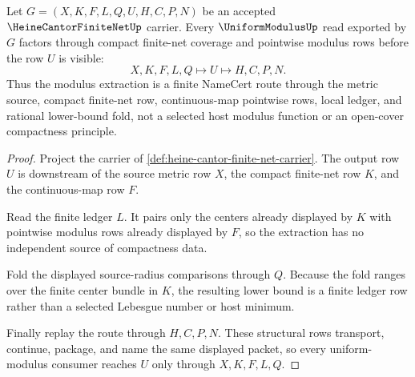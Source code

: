 \begin{theorem}
\label{thm:heine-cantor-finite-net-modulus-extraction}
Let $G=(X,K,F,L,Q,U,H,C,P,N)$ be an accepted $\HeineCantorFiniteNetUp$ carrier. Every $\UniformModulusUp$ read exported by $G$ factors through compact finite-net coverage and pointwise modulus rows before the row $U$ is visible:
$$
X,K,F,L,Q \longmapsto U \longmapsto H,C,P,N .
$$
Thus the modulus extraction is a finite NameCert route through the metric source, compact finite-net row, continuous-map pointwise rows, local ledger, and rational lower-bound fold, not a selected host modulus function or an open-cover compactness principle.
\end{theorem}
\begin{proof}
Project the carrier of \autoref{def:heine-cantor-finite-net-carrier}. The output row $U$ is downstream of the source metric row $X$, the compact finite-net row $K$, and the continuous-map row $F$.

Read the finite ledger $L$. It pairs only the centers already displayed by $K$ with pointwise modulus rows already displayed by $F$, so the extraction has no independent source of compactness data.

Fold the displayed source-radius comparisons through $Q$. Because the fold ranges over the finite center bundle in $K$, the resulting lower bound is a finite ledger row rather than a selected Lebesgue number or host minimum.

Finally replay the route through $H,C,P,N$. These structural rows transport, continue, package, and name the same displayed packet, so every uniform-modulus consumer reaches $U$ only through $X,K,F,L,Q$.
\end{proof}

